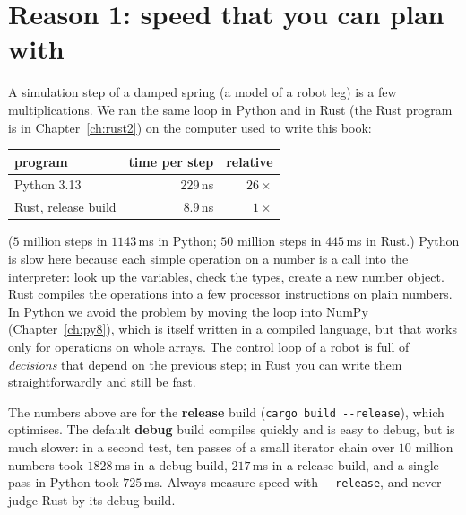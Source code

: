 \section*{Reason 1: speed that you can plan with}
A simulation step of a damped spring (a model of a robot leg) is a few multiplications. We ran the same loop in Python and in Rust (the Rust program is in Chapter~\ref{ch:rust2}) on the computer used to write this book:
\begin{center}
\renewcommand{\arraystretch}{1.2}
\begin{tabular}{lrr}
\textbf{program} & \textbf{time per step} & \textbf{relative}\\ \hline
Python 3.13 & 229\,ns & $26\times$\\
Rust, release build & 8.9\,ns & $1\times$\\
\end{tabular}
\end{center}
($5$ million steps in $1143$\,ms in Python; $50$ million steps in $445$\,ms in Rust.) Python is slow here because each simple operation on a number is a call into the interpreter: look up the variables, check the types, create a new number object. Rust compiles the operations into a few processor instructions on plain numbers. In Python we avoid the problem by moving the loop into NumPy (Chapter~\ref{ch:py8}), which is itself written in a compiled language, but that works only for operations on whole arrays. The control loop of a robot is full of \emph{decisions} that depend on the previous step; in Rust you can write them straightforwardly and still be fast.
\begin{keyidea}
The numbers above are for the \textbf{release} build (\verb!cargo build --release!), which optimises. The default \textbf{debug} build compiles quickly and is easy to debug, but is much slower: in a second test, ten passes of a small iterator chain over $10$ million numbers took $1828$\,ms in a debug build, $217$\,ms in a release build, and a single pass in Python took $725$\,ms. Always measure speed with \verb!--release!, and never judge Rust by its debug build.
\end{keyidea}
\begin{center}
\end{center}

